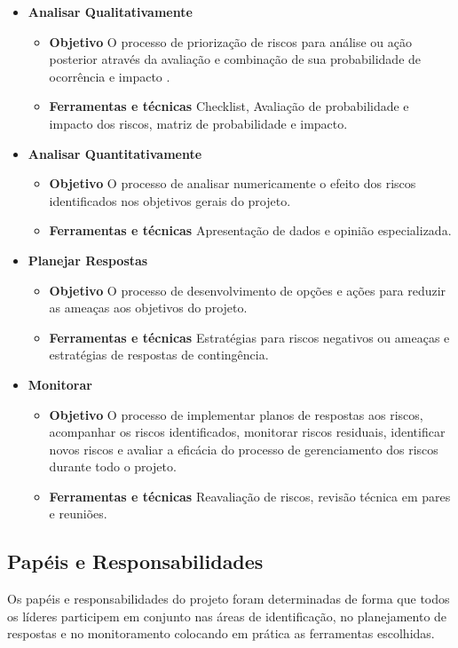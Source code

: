 \begin{apendicesenv}
\begin{itemize}
    \item \textbf{Analisar Qualitativamente}
        \begin{itemize}
            \item \textbf{Objetivo}
            O processo de priorização de riscos para análise ou ação posterior através da avaliação e combinação de sua probabilidade de ocorrência e impacto \cite{pmbok2004guia}.
            \item \textbf{Ferramentas e técnicas}
            Checklist, Avaliação de probabilidade e impacto dos riscos, matriz de probabilidade e impacto.
        \end{itemize}
    \item \textbf{Analisar Quantitativamente}
        \begin{itemize}
            \item \textbf{Objetivo}
            O processo de analisar numericamente o efeito dos riscos identificados nos objetivos gerais do projeto.
            \item \textbf{Ferramentas e técnicas}
            Apresentação de dados e opinião especializada.
        \end{itemize}
    \item \textbf{Planejar Respostas}
        \begin{itemize}
            \item \textbf{Objetivo}
            O processo de desenvolvimento de opções e ações para reduzir as ameaças aos objetivos do projeto.
            \item \textbf{Ferramentas e técnicas}
            Estratégias para riscos negativos ou ameaças e estratégias de respostas de contingência.
        \end{itemize}
    \item \textbf{Monitorar}
        \begin{itemize}
            \item \textbf{Objetivo}
            O processo de implementar planos de respostas aos riscos, acompanhar os riscos identificados, monitorar riscos residuais, identificar novos riscos e avaliar a eficácia do processo de gerenciamento dos riscos durante todo o projeto.
            \item \textbf{Ferramentas e técnicas}
            Reavaliação de riscos, revisão técnica em pares e reuniões.
        \end{itemize}
\end{itemize}


\subsection{Papéis e Responsabilidades}
Os papéis e responsabilidades do projeto foram determinadas de forma que todos os líderes participem em conjunto nas áreas de identificação, no planejamento de respostas e no monitoramento colocando em prática as ferramentas escolhidas.


\end{apendicesenv}
